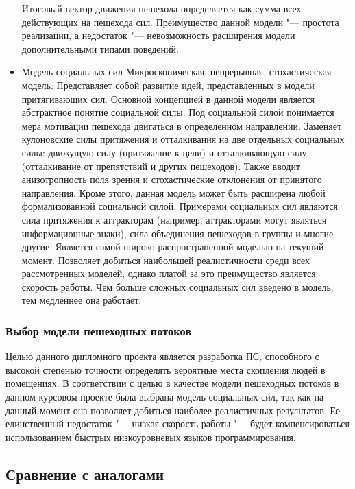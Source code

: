 \begin{itemize}
        Итоговый вектор движения пешехода определяется как сумма всех действующих на пешехода сил.
        Преимущество данной модели "--- простота реализации, а недостаток "--- невозможность расширения модели дополнительными типами поведений.
  \item Модель социальных сил
        Микроскопическая, непрерывная, стохастическая модель.
        Представляет собой развитие идей, представленных в модели притягивающих сил.
        Основной концепцией в данной модели является абстрактное понятие социальной силы. Под социальной силой понимается мера мотивации пешехода двигаться в определенном направлении.
        Заменяет кулоновские силы притяжения и отталкивания на две отдельных социальных силы: движущую силу (притяжение к цели) и отталкивающую силу (отталкивание от препятствий и других пешеходов).
        Также вводит анизотропность поля зрения и стохастические отклонения от принятого направления.
        Кроме этого, данная модель может быть расширена любой формализованной социальной силой.
        Примерами социальных сил являются сила притяжения к аттракторам (например, аттракторами могут являться информационные знаки), сила объединения пешеходов в группы и многие другие.
        Является самой широко распространенной моделью на текущий момент.
        Позволяет добиться наибольшей реалистичности среди всех рассмотренных моделей, однако платой за это преимущество является скорость работы.
        Чем больше сложных социальных сил введено в модель, тем медленнее она работает.
\end{itemize}

\subsubsection{Выбор модели пешеходных потоков}
\label{sub:domain:models:choice}

Целью данного дипломного проекта является разработка ПС, способного с высокой степенью точности определять вероятные места скопления людей в помещениях.
В соответствии с целью в качестве модели пешеходных потоков в данном курсовом проекте была выбрана модель социальных сил,
так как на данный момент она позволяет добиться наиболее реалистичных результатов.
Ее единственный недостаток "--- низкая скорость работы "--- будет компенсироваться использованием быстрых низкоуровневых языков программирования.

\subsection{Сравнение с аналогами}
\label{sub:domain:analogs}

